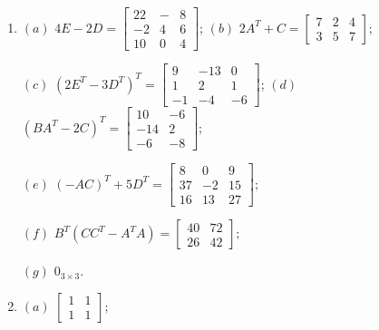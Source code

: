 \documentclass{report}
\begin{document}
\begin{enumerate}
\item $(a)$ $4E-2D = \left[
\begin{array}{rrr}
22 & - & 8 \\
-2 & 4 & 6 \\
10 & 0 & 4
\end{array}
\right]$; \hspace{2cm} $(b)$ $2A^{T}+C=\left[
\begin{array}{rrr}
7 & 2 & 4 \\
3 & 5 & 7
\end{array}
\right]$;

$(c)$ $\left( 2E^{T}-3D^{T}\right) ^{T}=\left[
\begin{array}{rrr}
9 & -13 & 0 \\
1 & 2 & 1 \\
-1 & -4 & -6
\end{array}
\right]$; \hspace{1.5cm} $(d)$ $\left( BA^{T}-2C\right)
^{T}=\left[
\begin{array}{rr}
10 & -6 \\
-14 & 2 \\
-6 & -8
\end{array}
\right]$;

$(e)$ $\left(-AC\right)^{T}+5D^{T}=\left[
\begin{array}{rrr}
8  &  0 & 9 \\
37 & -2 & 15 \\
16 & 13 & 27
\end{array}
\right];$

$(f)$ $B^{T}\left( CC^{T}-A^{T}A\right) = \left[
\begin{array}{rr}
40 & 72 \\
26 & 42
\end{array}
\right];$ \ \ 

$(g)$ $0_{3 \times 3}$.


\item $(a)$ $\left[
\begin{array}{rr}
1 & 1 \\
1 & 1
\end{array}
\right];$


\end{enumerate}
\end{document}
